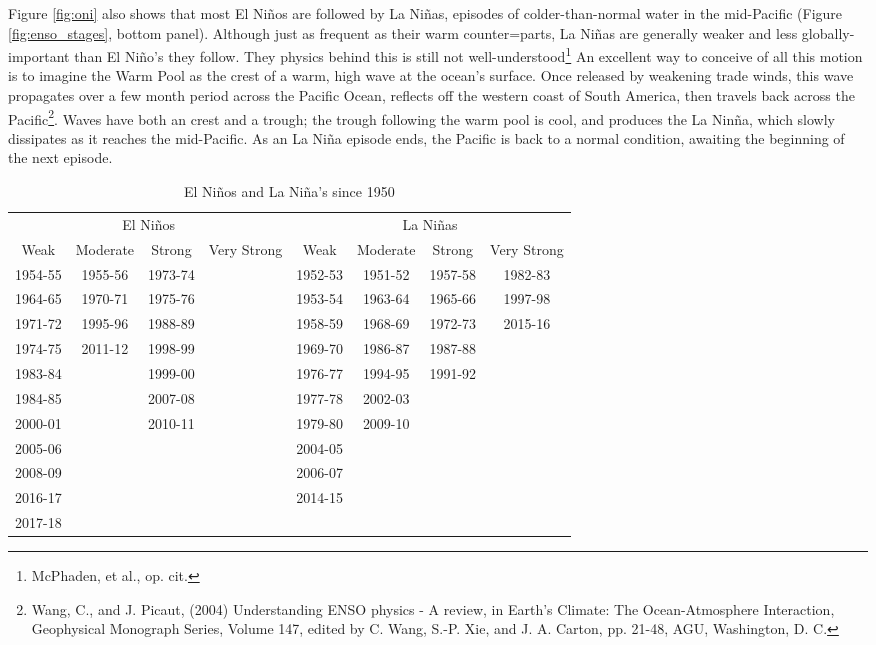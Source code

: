 \documentclass[amstex,12pt]{book}
\begin{document}
{Figure \ref{fig:oni} also shows that most El Ni\~nos are followed by La Ni\~nas, episodes of colder-than-normal water in the mid-Pacific (Figure \ref{fig:enso_stages}, bottom panel). Although just as frequent as their warm counter=parts, La Ni\~nas are generally weaker and less globally-important than El Ni\~no's they follow. They physics behind this is still not well-understood\footnote{McPhaden, et al., op. cit.} An excellent way to conceive of all this motion is to imagine the Warm Pool as the crest of a warm, high wave at the ocean's surface. Once released by weakening trade winds, this wave propagates over a few month period across the Pacific Ocean, reflects off the western coast of South America, then travels back across the Pacific\footnote{Wang, C., and J. Picaut, (2004) Understanding ENSO physics - A review, in Earth's Climate: The Ocean-Atmosphere Interaction, Geophysical Monograph Series, Volume 147, edited by C. Wang, S.-P. Xie, and J. A. Carton, pp. 21-48, AGU, Washington, D. C.}. Waves have both an crest and a trough; the trough following the warm pool is cool, and produces the La Nin\~na, which slowly dissipates as it reaches the mid-Pacific. As an La Ni\~na episode ends, the Pacific is back to a normal condition, awaiting the beginning of the next episode.\\

\begin{table} 
\centering
\caption{El Ni\~nos and La Ni\~na's since 1950}
\label{tab:enso_occurences}
\begin{tabular}{@{}cccccccc@{}} \toprule
\multicolumn{4}{c}{El Ni\~nos} &\multicolumn{4}{c}{La Ni\~nas}\\ \cmidrule(r){1-4} \cmidrule(r){5-8}%
Weak		&Moderate	&Strong		&Very Strong	&Weak			&Moderate	&Strong		&Very Strong\\ \midrule
1954-55	&1955-56	&1973-74	&							&1952-53	&1951-52	&1957-58	&1982-83\\
1964-65	&1970-71	&1975-76	&							&1953-54	&1963-64	&1965-66	&1997-98\\
1971-72	&1995-96	&1988-89	&							&1958-59	&1968-69	&1972-73	&2015-16\\
1974-75	&2011-12	&1998-99	&							&1969-70	&1986-87	&1987-88\\
1983-84	&					&1999-00	&							&1976-77	&1994-95	&1991-92\\
1984-85	&					&2007-08	&							&1977-78	&2002-03	\\
2000-01	&					&2010-11	&							&1979-80	&2009-10	\\
2005-06	&					&					&							&2004-05	\\
2008-09	&					&					&							&2006-07\\
2016-17	&					&					&							&2014-15\\
2017-18\\ \bottomrule
\end{tabular}
\end{table}


}
\end{document}
